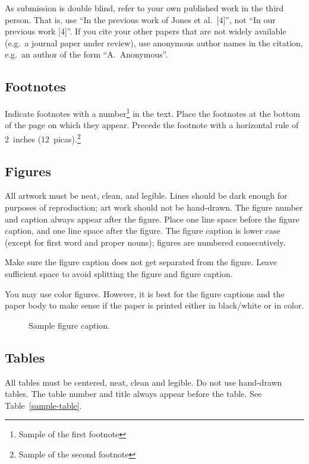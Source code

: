\documentclass{article} %
\begin{document}
As submission is double blind, refer to your own published work in the
third person. That is, use ``In the previous work of Jones et al.\ [4]'',
not ``In our previous work [4]''. If you cite your other papers that
are not widely available (e.g.\ a journal paper under review), use
anonymous author names in the citation, e.g.\ an author of the
form ``A.\ Anonymous''.


\subsection{Footnotes}

Indicate footnotes with a number\footnote{Sample of the first footnote} in the
text. Place the footnotes at the bottom of the page on which they appear.
Precede the footnote with a horizontal rule of 2~inches
(12~picas).\footnote{Sample of the second footnote}

\subsection{Figures}

All artwork must be neat, clean, and legible. Lines should be dark
enough for purposes of reproduction; art work should not be
hand-drawn. The figure number and caption always appear after the
figure. Place one line space before the figure caption, and one line
space after the figure. The figure caption is lower case (except for
first word and proper nouns); figures are numbered consecutively.

Make sure the figure caption does not get separated from the figure.
Leave sufficient space to avoid splitting the figure and figure caption.

You may use color figures.
However, it is best for the
figure captions and the paper body to make sense if the paper is printed
either in black/white or in color.
\begin{figure}[h]
\begin{center}
\fbox{\rule[-.5cm]{0cm}{4cm} \rule[-.5cm]{4cm}{0cm}}
\end{center}
\caption{Sample figure caption.}
\end{figure}

\subsection{Tables}

All tables must be centered, neat, clean and legible. Do not use hand-drawn
tables. The table number and title always appear before the table. See
Table~\ref{sample-table}.
\end{document}
